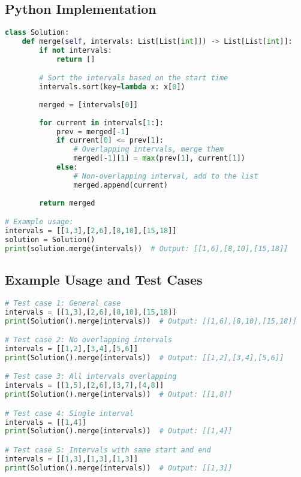 \subsection*{Python Implementation}
\begin{fullwidth}
\begin{lstlisting}[language=Python]
class Solution:
    def merge(self, intervals: List[List[int]]) -> List[List[int]]:
        if not intervals:
            return []

        # Sort the intervals based on the start time
        intervals.sort(key=lambda x: x[0])
        
        merged = [intervals[0]]
        
        for current in intervals[1:]:
            prev = merged[-1]
            if current[0] <= prev[1]:
                # Overlapping intervals, merge them
                merged[-1][1] = max(prev[1], current[1])
            else:
                # Non-overlapping interval, add to the list
                merged.append(current)
                
        return merged

# Example usage:
intervals = [[1,3],[2,6],[8,10],[15,18]]
solution = Solution()
print(solution.merge(intervals))  # Output: [[1,6],[8,10],[15,18]]
\end{lstlisting}
\end{fullwidth}

\subsection*{Example Usage and Test Cases}

\begin{lstlisting}[language=Python]
# Test case 1: General case
intervals = [[1,3],[2,6],[8,10],[15,18]]
print(Solution().merge(intervals))  # Output: [[1,6],[8,10],[15,18]]

# Test case 2: No overlapping intervals
intervals = [[1,2],[3,4],[5,6]]
print(Solution().merge(intervals))  # Output: [[1,2],[3,4],[5,6]]

# Test case 3: All intervals overlapping
intervals = [[1,5],[2,6],[3,7],[4,8]]
print(Solution().merge(intervals))  # Output: [[1,8]]

# Test case 4: Single interval
intervals = [[1,4]]
print(Solution().merge(intervals))  # Output: [[1,4]]

# Test case 5: Intervals with same start and end
intervals = [[1,3],[1,3],[1,3]]
print(Solution().merge(intervals))  # Output: [[1,3]]
\end{lstlisting}

